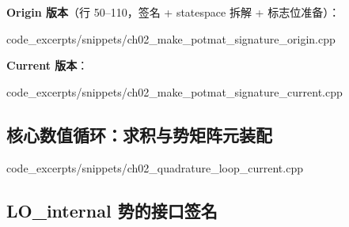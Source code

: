 \textbf{Origin 版本}（行 50--110，签名 + statespace 拆解 + 标志位准备）：


  {code_excerpts/snippets/ch02_make_potmat_signature_origin.cpp}

\textbf{Current 版本}：


  {code_excerpts/snippets/ch02_make_potmat_signature_current.cpp}

\subsection{核心数值循环：求积与势矩阵元装配}


  {code_excerpts/snippets/ch02_quadrature_loop_current.cpp}

\subsection{LO\_internal 势的接口签名}

